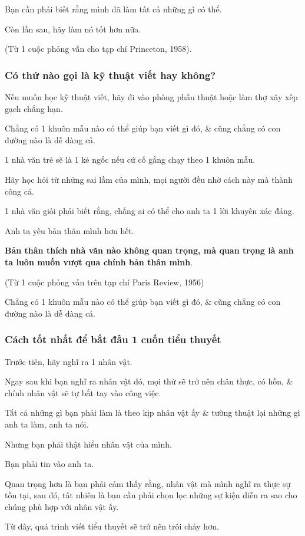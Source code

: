 \documentclass{article}
\begin{document}
Bạn cần phải biết rằng mình đã làm tất cả những gì có thể.

Còn lần sau, hãy làm nó tốt hơn nữa.

(Từ 1 cuộc phỏng vấn cho tạp chí Princeton, 1958).

\subsubsection{Có thứ nào gọi là kỹ thuật viết hay không?}
Nếu muốn học kỹ thuật viết, hãy đi vào phòng phẫu thuật hoặc làm thợ xây xếp gạch chẳng hạn.

Chẳng có 1 khuôn mẫu nào có thể giúp bạn viết gì đó, \& cũng chẳng có con đường nào là dễ dàng cả.

1 nhà văn trẻ sẽ là 1 kẻ ngốc nếu cứ cố gắng chạy theo 1 khuôn mẫu.

Hãy học hỏi từ những sai lầm của mình, mọi người đều nhờ cách này mà thành công cả.

1 nhà văn giỏi phải biết rằng, chẳng ai có thể cho anh ta 1 lời khuyên xác đáng.

Anh ta yêu bản thân mình hơn hết.

\textbf{Bản thân thích nhà văn nào không quan trọng, mà quan trọng là anh ta luôn muốn vượt qua chính bản thân mình}.

(Từ 1 cuộc phỏng vấn trên tạp chí Paris Review, 1956)

\textsf{Chẳng có 1 khuôn mẫu nào có thể giúp bạn viết gì đó, \& cũng chẳng có con đường nào là dễ dàng cả.}

\subsubsection{Cách tốt nhất để bắt đầu 1 cuốn tiểu thuyết}
Trước tiên, hãy nghĩ ra 1 nhân vật.

Ngay sau khi bạn nghĩ ra nhân vật đó, mọi thứ sẽ trở nên chân thực, có hồn, \& chính nhân vật sẽ tự bắt tay vào công việc.

Tất cả những gì bạn phải làm là theo kịp nhân vật ấy \& tường thuật lại những gì anh ta làm, anh ta nói.

Nhưng bạn phải thật hiểu nhân vật của mình.

Bạn phải tin vào anh ta.

Quan trọng hơn là bạn phải cảm thấy rằng, nhân vật mà mình nghĩ ra thực sự tồn tại, sau đó, tất nhiên là bạn cần phải chọn lọc những sự kiện diễn ra sao cho chúng phù hợp với nhân vật ấy.

Từ đây, quá trình viết tiểu thuyết sẽ trở nên trôi chảy hơn.
\end{document}
